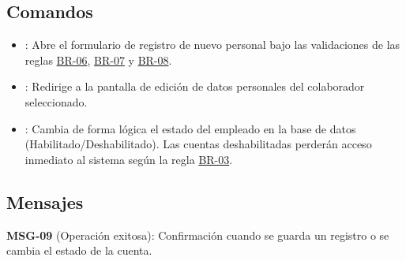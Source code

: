 \subsection{Comandos}
	\begin{itemize}
		\item {}: Abre el formulario de registro de nuevo personal bajo las validaciones de las reglas \hyperlink{BR-06}{BR-06}, \hyperlink{BR-07}{BR-07} y \hyperlink{BR-08}{BR-08}.
		\item {}: Redirige a la pantalla de edición de datos personales del colaborador seleccionado.
		\item {}: Cambia de forma lógica el estado del empleado en la base de datos (Habilitado/Deshabilitado). Las cuentas deshabilitadas perderán acceso inmediato al sistema según la regla \hyperlink{BR-03}{BR-03}.
	\end{itemize}

\subsection{Mensajes}
	\begin{Citemize}
		\item {\bf MSG-09} (Operación exitosa): Confirmación cuando se guarda un registro o se cambia el estado de la cuenta.
	\end{Citemize}
